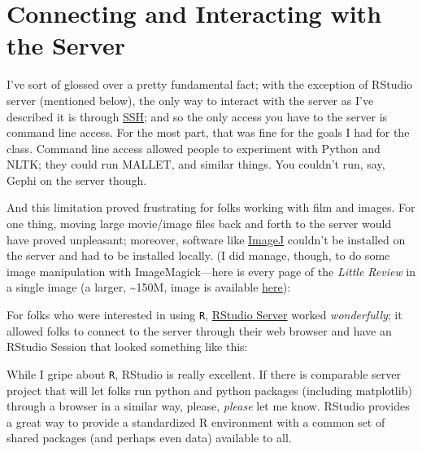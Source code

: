 \documentclass[
  12pt,
]{article}
\begin{document}
\hypertarget{connecting-and-interacting-with-the-server}{%
\section{Connecting and Interacting with the
Server}\label{connecting-and-interacting-with-the-server}}

I've sort of glossed over a pretty fundamental fact; with the exception
of RStudio server (mentioned below), the only way to interact with the
server as I've described it is through
\href{http://en.wikipedia.org/wiki/Secure_Shell}{SSH}; and so the only
access you have to the server is command line access. For the most part,
that was fine for the goals I had for the class. Command line access
allowed people to experiment with Python and NLTK; they could run
MALLET, and similar things. You couldn't run, say, Gephi on the server
though.

And this limitation proved frustrating for folks working with film and
images. For one thing, moving large movie/image files back and forth to
the server would have proved unpleasant; moreover, software like
\href{http://rsbweb.nih.gov/ij/}{ImageJ} couldn't be installed on the
server and had to be installed locally. (I did manage, though, to do
some image manipulation with ImageMagick---here is every page of the
\emph{Little Review} in a single image (a larger, \textasciitilde150M,
image is available
\href{https://www.dropbox.com/s/idnsh1tmkteeevu/lr.png}{here}):

For folks who were interested in using \texttt{R},
\href{http://www.rstudio.com/ide/docs/server/getting_started}{RStudio
Server} worked \emph{wonderfully}; it allowed folks to connect to the
server through their web browser and have an RStudio Session that looked
something like this:

While I gripe about \texttt{R}, RStudio is really excellent. If there is
comparable server project that will let folks run python and python
packages (including matplotlib) through a browser in a similar way,
please, \emph{please} let me know. RStudio provides a great way to
provide a standardized R environment with a common set of shared
packages (and perhaps even data) available to all.
\end{document}
